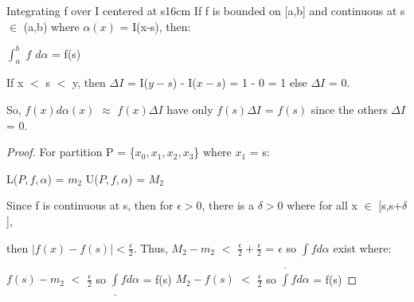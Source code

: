     \vspace{0.5cm}



    \begin{wtheorem}{Integrating f over I centered at s}{16cm}
        If f is bounded on [a,b] and continuous at s $\in$ (a,b) where
        $\alpha(x)$ = I(x-s), then:

        \hspace{0.5cm}
        $\int_a^b$ $f$ $d\alpha$ = f(s)
    \end{wtheorem}

    \begin{intuition}
        If x $<$ s $<$ y, then $\Delta I$ = I($y-s$) - I($x-s$) = 1 - 0 = 1
        else $\Delta I$ = 0.

        So, $f(x) d\alpha(x)$ $\approx$ $f(x) \Delta I$
        have only $f(s) \Delta I$ = $f(s)$ since the others $\Delta I$ = 0.
    \end{intuition}

    \vspace{0.1cm}
    
    \begin{proof}
        For partition P = \{$x_0,x_1,x_2,x_3$\} where $x_1$ = s:

        \hspace{0.5cm}
        L($P,f,\alpha$) = $m_2$
        \hspace{1cm}
        U($P,f,\alpha$) = $M_2$

        Since f is continuous at s, then for $\epsilon > 0$, there is a $\delta > 0$
        where for all x $\in$ [s,s+$\delta$],
        
        then $|f(x)-f(s)| < \frac{\epsilon}{2}$.
        Thus, $M_2 - m_2$ $<$ $\frac{\epsilon}{2} + \frac{\epsilon}{2}$
        = $\epsilon$ so $\int f d\alpha$ exist where:

        \hspace{0.5cm}
        $f(s) - m_2$ $<$ $\frac{\epsilon}{2}$
        so $\underline{\int} f d\alpha$ = f(s)
        \hspace{1cm}
        $M_2 - f(s)$ $<$ $\frac{\epsilon}{2}$
        so $\overline{\int} f d\alpha$ = f(s)
    \end{proof}

    

